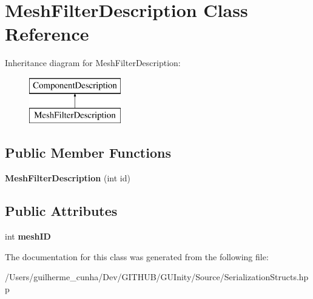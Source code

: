 \hypertarget{class_mesh_filter_description}{}\section{Mesh\+Filter\+Description Class Reference}
\label{class_mesh_filter_description}
Inheritance diagram for Mesh\+Filter\+Description\+:\begin{figure}[H]
\begin{center}
\leavevmode
\includegraphics[height=2.000000cm]{class_mesh_filter_description}
\end{center}
\end{figure}
\subsection*{Public Member Functions}
\begin{DoxyCompactItemize}
\item 
\hypertarget{class_mesh_filter_description_a8ab678722bd880505fa05fcc1b0f8694}{}{\bfseries Mesh\+Filter\+Description} (int id)\label{class_mesh_filter_description_a8ab678722bd880505fa05fcc1b0f8694}

\end{DoxyCompactItemize}
\subsection*{Public Attributes}
\begin{DoxyCompactItemize}
\item 
\hypertarget{class_mesh_filter_description_aacb950a39abb1be259dca00654bf3893}{}int {\bfseries mesh\+I\+D}\label{class_mesh_filter_description_aacb950a39abb1be259dca00654bf3893}

\end{DoxyCompactItemize}


The documentation for this class was generated from the following file\+:\begin{DoxyCompactItemize}
\item 
/\+Users/guilherme\+\_\+cunha/\+Dev/\+G\+I\+T\+H\+U\+B/\+G\+U\+Inity/\+Source/Serialization\+Structs.\+hpp\end{DoxyCompactItemize}
